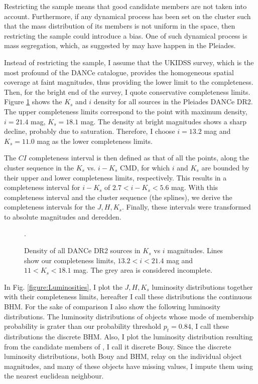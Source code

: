 Restricting the sample means that good candidate members are not taken into account. Furthermore, if any dynamical process has been set on the cluster such that the mass distribution of its members is not uniform in the space, then restricting the sample could introduce a bias. One of such dynamical process is mass segregation, which, as suggested by \citet{Adams2001} may have happen in the Pleiades. 

Instead of restricting the sample, I assume that the UKIDSS survey, which is the most profound of the DANCe catalogue, provides the homogeneous spatial coverage at faint magnitudes, thus providing the lower limit to the completeness. Then, for the bright end of the survey, I quote conservative completeness limits. Figure \ref{figure:completeness} shows the $K_s$ and $i$ density  for all sources in the Pleiades DANCe DR2. The upper completeness limits correspond to the point with maximum density, $i=21.4$ mag, $K_s=18.1$ mag. The density at bright magnitudes shows a sharp decline, probably due to saturation. Therefore, I choose $i=13.2$ mag and $K_s=11.0$ mag as the lower completeness limits.

The $CI$ completeness interval is then defined as that of all the points, along the cluster sequence in the $K_s$ vs. $i-K_s$ CMD, for which $i$ and $K_s$ are bounded by their upper and lower completeness limits, respectively. This results in a completeness interval for $i-K_s$ of  $2.7<i-K_s<5.6$ mag. With this completeness interval and the cluster sequence (the splines), we derive the completeness intervals for the $J,H,K_s$. Finally, these intervals were transformed to absolute magnitudes and deredden. 
\begin{figure}[htbp]
\begin{center}
\caption{Density of all DANCe DR2 sources in $K_s$ vs $i$ magnitudes. Lines show our completeness limits, $13.2<i<21.4$ mag and $11<K_s<18.1$ mag. The grey area is considered incomplete.}
\label{figure:completeness}.
\end{center}
\end{figure}


In Fig. \ref{figure:Luminosities}, I plot the $J,H,K_s$ luminosity distributions together with their completeness limits, hereafter I call these distributions the continuous BHM. For the sake of comparison I also show the following luminosity distributions. The luminosity distributions of objects whose mode of membership probability is grater than our probability threshold $p_t=0.84$, I call these distributions the discrete BHM. Also, I plot the luminosity distribution resulting from the candidate members of \citet{Bouy2015}, I call it discrete Bouy. Since the discrete luminosity distributions, both Bouy and BHM, relay on the individual object magnitudes, and many of these objects have missing values, I impute them using the nearest euclidean neighbour. 

